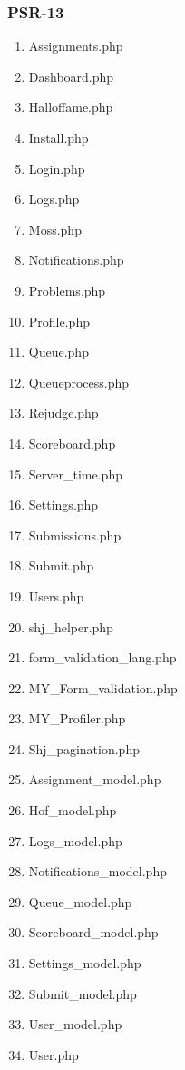 \subsubsection{PSR-13}
\begin{enumerate}
	\item Assignments.php
	\item Dashboard.php
	\item Halloffame.php
	\item Install.php
	\item Login.php
	\item Logs.php
	\item Moss.php
	\item Notifications.php
	\item Problems.php
	\item Profile.php
	\item Queue.php
	\item Queueprocess.php
	\item Rejudge.php
	\item Scoreboard.php
	\item Server\_time.php
	\item Settings.php
	\item Submissions.php
	\item Submit.php
	\item Users.php
	\item shj\_helper.php
	\item form\_validation\_lang.php
	\item MY\_Form\_validation.php
	\item MY\_Profiler.php
	\item Shj\_pagination.php
	\item Assignment\_model.php
	\item Hof\_model.php
	\item Logs\_model.php
	\item Notifications\_model.php
	\item Queue\_model.php
	\item Scoreboard\_model.php
	\item Settings\_model.php
	\item Submit\_model.php
	\item User\_model.php
	\item User.php
\end{enumerate}


